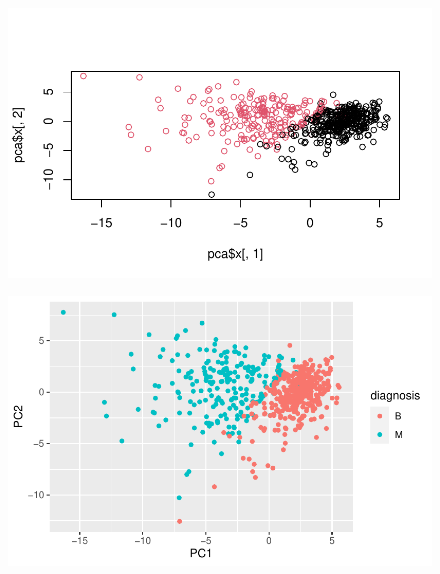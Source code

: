 \documentclass[
  letterpaper,
  DIV=11,
  numbers=noendperiod]{scrartcl}
\newenvironment{Shaded}{\begin{snugshade}}{\end{snugshade}}
\newcommand{\AttributeTok}[1]{\textcolor[rgb]{0.40,0.45,0.13}{#1}}
\newcommand{\FunctionTok}[1]{\textcolor[rgb]{0.28,0.35,0.67}{#1}}
\newcommand{\NormalTok}[1]{\textcolor[rgb]{0.00,0.23,0.31}{#1}}
\newcommand{\OtherTok}[1]{\textcolor[rgb]{0.00,0.23,0.31}{#1}}
\newcommand{\SpecialCharTok}[1]{\textcolor[rgb]{0.37,0.37,0.37}{#1}}
\begin{document}
\begin{figure}[H]

{\centering \includegraphics{Class-8-mini-project_files/figure-pdf/unnamed-chunk-10-1.pdf}

}

\end{figure}

\begin{Shaded}
\end{Shaded}

\begin{figure}[H]

{\centering \includegraphics{Class-8-mini-project_files/figure-pdf/unnamed-chunk-11-1.pdf}

}

\end{figure}
\end{document}
